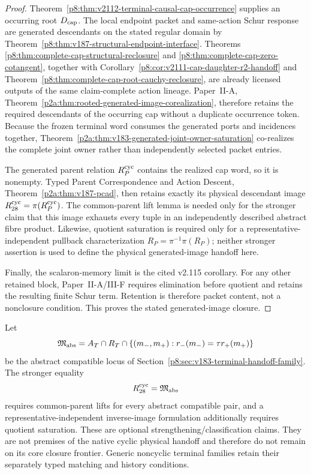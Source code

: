 \documentclass[12pt,a4paper]{article}
\begin{document}
\begin{proof}
Theorem~\ref{p8:thm:v2112-terminal-causal-cap-occurrence} supplies an occurring
root $D_{\rm cap}$.  The local endpoint packet and same-action Schur response
are generated descendants on the stated regular domain by
Theorem~\ref{p8:thm:v187-structural-endpoint-interface}.  Theorems
\ref{p8:thm:complete-cap-structural-reclosure} and
\ref{p8:thm:complete-cap-zero-cotangent}, together with
Corollary~\ref{p8:cor:v2111-cap-daughter-r2-handoff} and
Theorem~\ref{p8:thm:complete-cap-root-cauchy-reclosure}, are already licensed
outputs of the same claim-complete action lineage.  Paper~II-A,
Theorem~\ref{p2a:thm:rooted-generated-image-corealization}, therefore retains
the required descendants of the occurring cap without a duplicate occurrence
token.  Because the frozen terminal word consumes the generated ports and
incidences together, Theorem~\ref{p2a:thm:v183-generated-joint-owner-saturation}
co-realizes the complete joint owner rather than independently selected packet
entries.

The generated parent relation $R_P^{\rm cyc}$ contains the realized cap word,
so it is nonempty.  Typed Parent Correspondence and Action Descent,
Theorem~\ref{p2a:thm:v187-pcad}, then retains exactly its physical descendant
image $R_{28}^{\rm cyc}=\pi(R_P^{\rm cyc})$.  The common-parent lift lemma is
needed only for the stronger claim that this image exhausts every tuple in an
independently described abstract fibre product.  Likewise, quotient saturation
is required only for a representative-independent pullback characterization
$R_P=\pi^{-1}\pi(R_P)$; neither stronger assertion is used to define the
physical generated-image handoff here.

Finally, the scalaron-memory limit is the cited v2.115 corollary.  For any
other retained block, Paper~II-A/III-F requires elimination before quotient and
retains the resulting finite Schur term.  Retention is therefore packet
content, not a nonclosure condition.  This proves the stated generated-image
closure.
\end{proof}

\begin{corollary}
\label{p8:cor:v2122-g28-full-locus-firewall}
Let
\[
 \mathfrak M_{\rm abs}
 =A_T\cap R_T\cap
 \{(m_-,m_+):r_-(m_-)=\tau r_+(m_+)\}
\]
be the abstract compatible locus of
Section~\ref{p8:sec:v183-terminal-handoff-family}.  The stronger equality
\[
 R_{28}^{\rm cyc}=\mathfrak M_{\rm abs}
\]
requires common-parent lifts for every abstract compatible pair, and a
representative-independent inverse-image formulation additionally requires
quotient saturation.  These are optional strengthening/classification claims.
They are not premises of the native cyclic physical handoff and therefore do
not remain on its core closure frontier.  Generic noncyclic terminal families
retain their separately typed matching and history conditions.
\end{corollary}
\end{document}
